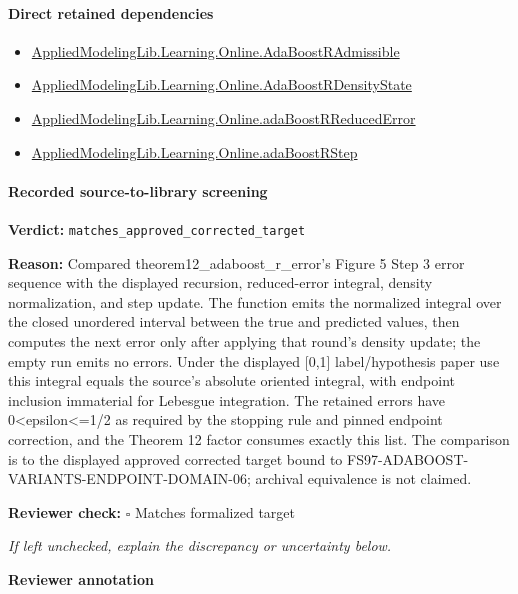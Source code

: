 \documentclass[10pt]{article}
\newcommand{\reviewerbox}{%
  \par\noindent\fbox{\parbox{0.96\linewidth}{\rule{0pt}{0.38in}}}\par
}
\newcommand{\reviewmatch}[1]{%
  \par\noindent\textbf{Reviewer check:} $\square$\; #1\par
  \noindent\emph{If left unchecked, explain the discrepancy or uncertainty below.}\par
}
\begin{document}
\paragraph{Direct retained dependencies}
\begin{itemize}\raggedright
\item \hyperlink{library-prerequisite-629f39db1994b79f}{Applied\allowbreak{}Modeling\allowbreak{}Lib.\allowbreak{}Learning.\allowbreak{}Online.\allowbreak{}Ada\allowbreak{}Boost\allowbreak{}R\allowbreak{}Admissible}
\item \hyperlink{library-prerequisite-05718297c0c800e4}{Applied\allowbreak{}Modeling\allowbreak{}Lib.\allowbreak{}Learning.\allowbreak{}Online.\allowbreak{}Ada\allowbreak{}Boost\allowbreak{}R\allowbreak{}Density\allowbreak{}State}
\item \hyperlink{governing-declaration-fe36bd27b8697a7b}{Applied\allowbreak{}Modeling\allowbreak{}Lib.\allowbreak{}Learning.\allowbreak{}Online.\allowbreak{}ada\allowbreak{}Boost\allowbreak{}R\allowbreak{}Reduced\allowbreak{}Error}
\item \hyperlink{governing-declaration-07709be11ef699d2}{Applied\allowbreak{}Modeling\allowbreak{}Lib.\allowbreak{}Learning.\allowbreak{}Online.\allowbreak{}ada\allowbreak{}Boost\allowbreak{}R\allowbreak{}Step}
\end{itemize}
\paragraph{Recorded source-to-library screening}
\textbf{Verdict:} \texttt{matches\_approved\_corrected\_target}
\\
{\raggedright
\textbf{Reason:} Compared theorem12\_\allowbreak{}adaboost\_\allowbreak{}r\_\allowbreak{}error's Figure 5 Step 3 error sequence with the displayed recursion, reduced-\allowbreak{}error integral, density normalization, and step update.\allowbreak{} The function emits the normalized integral over the closed unordered interval between the true and predicted values, then computes the next error only after applying that round's density update;\allowbreak{} the empty run emits no errors.\allowbreak{} Under the displayed [0,1] label/\allowbreak{}hypothesis paper use this integral equals the source's absolute oriented integral, with endpoint inclusion immaterial for Lebesgue integration.\allowbreak{} The retained errors have 0<epsilon<=1/\allowbreak{}2 as required by the stopping rule and pinned endpoint correction, and the Theorem 12 factor consumes exactly this list.\allowbreak{} The comparison is to the displayed approved corrected target bound to FS97-\allowbreak{}ADABOOST-\allowbreak{}VARIANTS-\allowbreak{}ENDPOINT-\allowbreak{}DOMAIN-\allowbreak{}06;\allowbreak{} archival equivalence is not claimed.\allowbreak{}
\par}
\reviewmatch{Matches formalized target}
\noindent\textbf{Reviewer annotation}\par
\reviewerbox
\clearpage
\hypertarget{library-prerequisite-e236e0a8a294e6f8}{}
\end{document}
